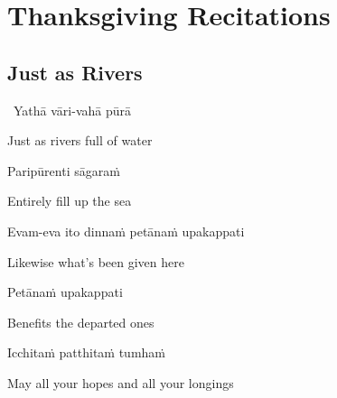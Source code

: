\ifdesktopversion
{}
\else
{}
\fi

\chapter{Thanksgiving Recitations}

\clearpage

\section{Just as Rivers}
\label{just-as-rivers}

\begin{leader}
  \anglebracketleft\ \hspace{-0.5mm}Yathā vāri-vahā pūrā \hspace{-0.5mm}\anglebracketright\
\end{leader}

\begin{english}
  Just as rivers full of water
\end{english}

Paripūrenti sāgaraṁ

\begin{english}
  Entirely fill up the sea
\end{english}

Evam-eva ito dinnaṁ petānaṁ upakappati

\begin{english}
  Likewise what's been given here\hyperlink{endnote114-appendix}{\hypertarget{endnote114-body}{}}
\end{english}

Petānaṁ upakappati

\begin{english}
  Benefits the departed ones\hyperlink{endnote115-appendix}{\hypertarget{endnote115-body}{}}
\end{english}


Icchitaṁ patthitaṁ tumhaṁ

\begin{english}
  May all your hopes and all your longings
\end{english}

